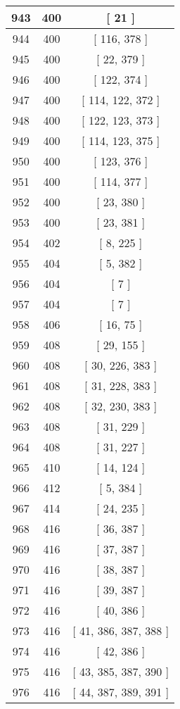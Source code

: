 \begin{center}
\begin{longtable}[H]{|| c c c ||}
\hline
943 & 400 & [ 21 ] \\ 
\hline
944 & 400 & [ 116, 378 ] \\ 
\hline
945 & 400 & [ 22, 379 ] \\ 
\hline
946 & 400 & [ 122, 374 ] \\ 
\hline
947 & 400 & [ 114, 122, 372 ] \\ 
\hline
948 & 400 & [ 122, 123, 373 ] \\ 
\hline
949 & 400 & [ 114, 123, 375 ] \\ 
\hline
950 & 400 & [ 123, 376 ] \\ 
\hline
951 & 400 & [ 114, 377 ] \\ 
\hline
952 & 400 & [ 23, 380 ] \\ 
\hline
953 & 400 & [ 23, 381 ] \\ 
\hline
954 & 402 & [ 8, 225 ] \\ 
\hline
955 & 404 & [ 5, 382 ] \\ 
\hline
956 & 404 & [ 7 ] \\ 
\hline
957 & 404 & [ 7 ] \\ 
\hline
958 & 406 & [ 16, 75 ] \\ 
\hline
959 & 408 & [ 29, 155 ] \\ 
\hline
960 & 408 & [ 30, 226, 383 ] \\ 
\hline
961 & 408 & [ 31, 228, 383 ] \\ 
\hline
962 & 408 & [ 32, 230, 383 ] \\ 
\hline
963 & 408 & [ 31, 229 ] \\ 
\hline
964 & 408 & [ 31, 227 ] \\ 
\hline
965 & 410 & [ 14, 124 ] \\ 
\hline
966 & 412 & [ 5, 384 ] \\ 
\hline
967 & 414 & [ 24, 235 ] \\ 
\hline
968 & 416 & [ 36, 387 ] \\ 
\hline
969 & 416 & [ 37, 387 ] \\ 
\hline
970 & 416 & [ 38, 387 ] \\ 
\hline
971 & 416 & [ 39, 387 ] \\ 
\hline
972 & 416 & [ 40, 386 ] \\ 
\hline
973 & 416 & [ 41, 386, 387, 388 ] \\ 
\hline
974 & 416 & [ 42, 386 ] \\ 
\hline
975 & 416 & [ 43, 385, 387, 390 ] \\ 
\hline
976 & 416 & [ 44, 387, 389, 391 ] \\ 
\hline

\end{longtable}
\end{center}
